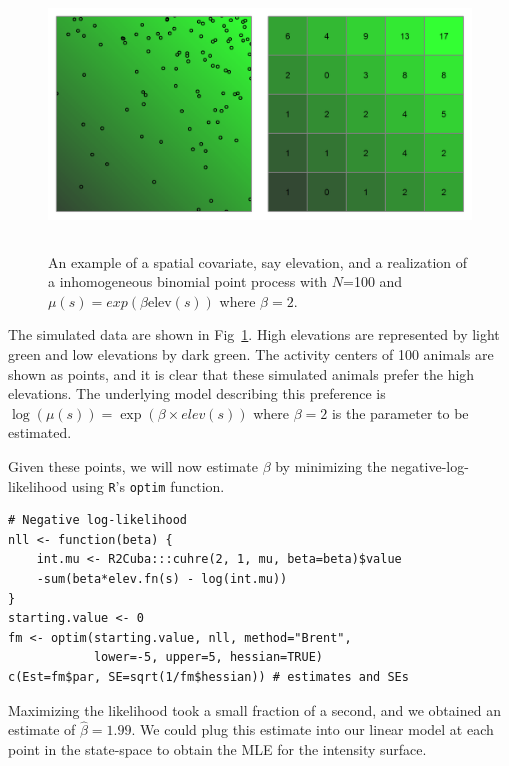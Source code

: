 \begin{figure}[ht]
\centering
\includegraphics[width=5in,height=2.5in]{Ch11/figs/heteroPlots}
\label{state-space.fig.hetero}
\caption{An example of a spatial covariate, say elevation, and a
  realization of a inhomogeneous binomial point process with $N$=100
  and $\mu(s) = exp(\beta \mbox{elev}(s))$ where $\beta=2$.}
\end{figure}

The simulated data are shown in Fig~\ref{state-space.fig.hetero}. High elevations
are represented by light green and low elevations by dark green. The
activity centers of 100 animals are shown as
points, and it is clear that these simulated animals prefer the high
elevations.  %
The underlying model describing this preference is
$\log(\mu(s)) = \exp(\beta \times elev(s))$
where $\beta=2$ is the parameter to be estimated.

Given these points, we will now estimate $\beta$ by minimizing the
negative-log-likelihood using \verb+R+'s \verb+optim+ function.

\begin{small}
\begin{verbatim}
# Negative log-likelihood
nll <- function(beta) {
    int.mu <- R2Cuba:::cuhre(2, 1, mu, beta=beta)$value
    -sum(beta*elev.fn(s) - log(int.mu))
}
starting.value <- 0
fm <- optim(starting.value, nll, method="Brent",
            lower=-5, upper=5, hessian=TRUE)
c(Est=fm$par, SE=sqrt(1/fm$hessian)) # estimates and SEs
\end{verbatim}
\end{small}


Maximizing the likelihood took a small fraction of a second, and we
obtained an estimate of $\hat{\beta}=1.99$. We could plug
this estimate into our linear model at each point in the state-space to
obtain the MLE for the intensity surface.

